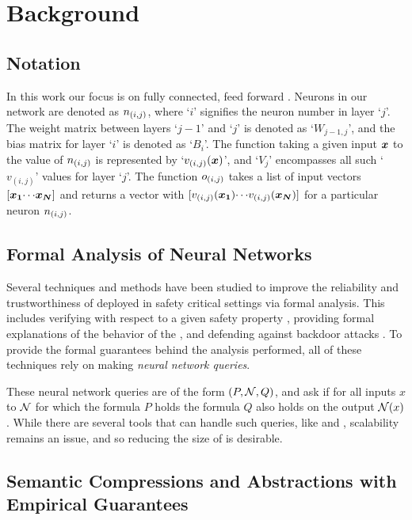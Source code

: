 \section{Background}
\subsection{Notation}

In this work our focus is on fully connected, feed forward \relu \dnn. 
Neurons in our network are denoted as $n_{(i,j)}$, where `$i$' signifies the 
neuron number in layer `$j$'.  %
The weight matrix between layers `${j-1}$' and `$j$' is denoted as `$W_{{j-1},
j}$', and the bias matrix for layer `$i$' is denoted as `$B_{i}$'. 
The function taking a given input $\boldsymbol{x}$ to the value of $n_{(i,j)}$ is
represented by `$v_{(i,j)}(\boldsymbol{x})$', %
and `$V_{j}$' encompasses all such `$v_{(i,j)}$' values for layer `$j$'. 
The function $o_{(i,j)}$ takes a list of input vectors
$[\boldsymbol{x_1} {\cdots} \boldsymbol{x_N}]$ and returns a vector with
$[v_{(i,j)}(\boldsymbol{x_1}) {\cdots} v_{(i,j)}(\boldsymbol{x_N})]$ for a particular
neuron $n_{(i,j)}$.  %

\subsection{ Formal Analysis of Neural Networks }
\label{s:form-an}

Several techniques and methods have been studied to improve the reliability and
trustworthiness of \dnn deployed in safety critical settings via formal
analysis. This includes verifying \dnn with respect to a given
safety property \cite{reluplex, cegar-nn, deeppoly, cegarette, cleverest-nn,
conv-abs-gk, deep-abstract, lin-comb-abs-jan}, providing formal explanations of
the behavior of the \dnn \cite{minimal-image-fxai, overview-fxai}, and defending
against backdoor attacks \cite{backdoor-verification}.
 To provide the formal guarantees behind the
analysis performed, all of these techniques rely on making \textit{neural
network queries}. 

These neural network queries are of the form $(P, \mathcal{N}, Q)$, and ask if
for all inputs $x$ to $\mathcal{N}$ for which the formula $P$ holds
the formula $Q$ also holds on the output $\mathcal{N}(x)$. While there are several
tools that can handle such queries, like \marabou and \abcrown, scalability
remains an issue, and so reducing the size of \cnc is desirable.

\subsection{Semantic Compressions and Abstractions with Empirical Guarantees}
\label{s:emp-abs}

